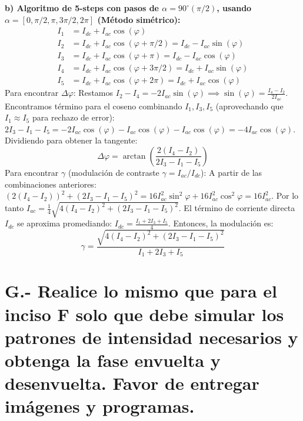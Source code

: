 \documentclass[12pt,letterpaper]{article}
\begin{document}
	\textbf{b) Algoritmo de 5-steps con pasos de $\alpha=90^\circ (\pi/2)$, usando $\alpha = [0, \pi/2, \pi, 3\pi/2, 2\pi]$ (Método simétrico):}
	\begin{align*}
		I_1 &= I_{dc} + I_{ac}\cos(\varphi) \\
		I_2 &= I_{dc} + I_{ac}\cos(\varphi + \pi/2) = I_{dc} - I_{ac}\sin(\varphi) \\
		I_3 &= I_{dc} + I_{ac}\cos(\varphi + \pi) = I_{dc} - I_{ac}\cos(\varphi) \\
		I_4 &= I_{dc} + I_{ac}\cos(\varphi + 3\pi/2) = I_{dc} + I_{ac}\sin(\varphi) \\
		I_5 &= I_{dc} + I_{ac}\cos(\varphi + 2\pi) = I_{dc} + I_{ac}\cos(\varphi)
	\end{align*}
	Para encontrar $\Delta\varphi$:
	Restamos $I_2 - I_4 = -2I_{ac}\sin(\varphi) \implies \sin(\varphi) = \frac{I_4 - I_2}{2I_{ac}}$.
	Encontramos término para el coseno combinando $I_1, I_3, I_5$ (aprovechando que $I_1 \approx I_5$ para rechazo de error):
	$2I_3 - I_1 - I_5 = -2I_{ac}\cos(\varphi) - I_{ac}\cos(\varphi) - I_{ac}\cos(\varphi) = -4I_{ac}\cos(\varphi)$.
	Dividiendo para obtener la tangente:
	\[
	\Delta\varphi = \arctan\left( \frac{2(I_4 - I_2)}{2I_3 - I_1 - I_5} \right)
	\]
	Para encontrar $\gamma$ (modulación de contraste $\gamma = I_{ac}/I_{dc}$):
	A partir de las combinaciones anteriores:
	$(2(I_4 - I_2))^2 + (2I_3 - I_1 - I_5)^2 = 16I_{ac}^2\sin^2\varphi + 16I_{ac}^2\cos^2\varphi = 16I_{ac}^2$.
	Por lo tanto $I_{ac} = \frac{1}{4}\sqrt{4(I_4 - I_2)^2 + (2I_3 - I_1 - I_5)^2}$.
	El término de corriente directa $I_{dc}$ se aproxima promediando: $I_{dc} = \frac{I_1 + 2I_3 + I_5}{4}$.
	Entonces, la modulación es:
	\[
	\gamma = \frac{\sqrt{4(I_4 - I_2)^2 + (2I_3 - I_1 - I_5)^2}}{I_1 + 2I_3 + I_5}
	\]
	
	\newpage
	\section*{G.- Realice lo mismo que para el inciso F solo que debe simular los patrones de intensidad necesarios y obtenga la fase envuelta y desenvuelta. Favor de entregar imágenes y programas.}
	
\end{document}
